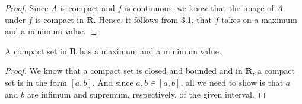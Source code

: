 \begin{questions}

    \begin{solution}
        
        \begin{proof}
            Since $A$ is compact and $f$ is continuous, we
            know that the image of $A$ under $f$ is compact
            in $\mathbf{R}$. Hence, it follows from 3.1,
            that $f$ takes on a maximum and a minimum value.
        \end{proof}

        \begin{lemma}
            A compact set in $\mathbf{R}$ has a maximum
            and a minimum value.
            \begin{proof}
                We know that a compact set is closed and
                bounded and in $\mathbf{R}$, a compact set
                is in the form $[a,b]$. And since $a, b \in
                [a,b]$, all we need to show is that $a$ and
                $b$ are infimum and supremum, respectively,
                of the given interval.
            \end{proof}
        \end{lemma}
    \end{solution}
    
\end{questions}